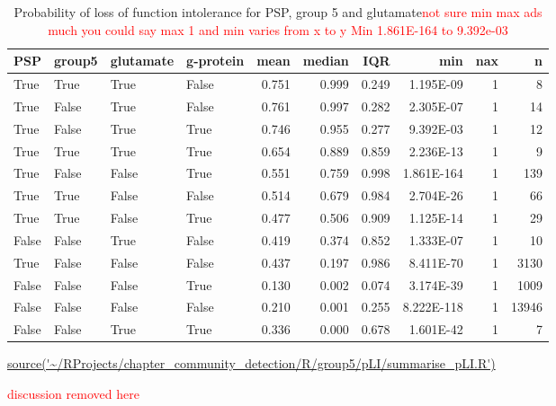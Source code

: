 \begin{table}[ht]
\centering
\setlength{\extrarowheight}{2pt}
\begin{tabular}{llllrrrrrr}
  \toprule
PSP & group5 & glutamate & g-protein & mean & median & IQR & min & nax & n \\ 
  \midrule
True   & True   & True   & False   & 0.751 & 0.999 & 0.249 & 1.195E-09 & 1 & 8 \\ 
  True   & False   & True   & False   & 0.761 & 0.997 & 0.282 & 2.305E-07 & 1 & 14 \\ 
  True   & False   & True   & True   & 0.746 & 0.955 & 0.277 & 9.392E-03 & 1 & 12 \\ 
  True   & True   & True   & True   & 0.654 & 0.889 & 0.859 & 2.236E-13 & 1 & 9 \\ 
  True   & False   & False   & True   & 0.551 & 0.759 & 0.998 & 1.861E-164 & 1 & 139 \\ 
  True   & True   & False   & False   & 0.514 & 0.679 & 0.984 & 2.704E-26 & 1 & 66 \\ 
  True   & True   & False   & True   & 0.477 & 0.506 & 0.909 & 1.125E-14 & 1 & 29 \\ 
  False   & False   & True   & False   & 0.419 & 0.374 & 0.852 & 1.333E-07 & 1 & 10 \\ 
  True   & False   & False   & False   & 0.437 & 0.197 & 0.986 & 8.411E-70 & 1 & 3130 \\ 
  False   & False   & False   & True   & 0.130 & 0.002 & 0.074 & 3.174E-39 & 1 & 1009 \\ 
  False   & False   & False   & False   & 0.210 & 0.001 & 0.255 & 8.222E-118 & 1 & 13946 \\ 
  False   & False   & True   & True   & 0.336 & 0.000 & 0.678 & 1.601E-42 & 1 & 7 \\ 
   \bottomrule
\end{tabular}
\caption{Probability of loss of function intolerance for PSP, group 5 and glutamate\textcolor{red}{not sure min max ads much you could say max 1 and min varies from x to y Min 1.861E-164 to 9.392e-03}} 
\tiny\url{source('~/RProjects/chapter_community_detection/R/group5/pLI/summarise_pLI.R')}
\label{tab:Probability of loss of function intolerance for PSP, group 5 and glutamate}
\end{table}
\textcolor{red}{discussion removed here}
 
